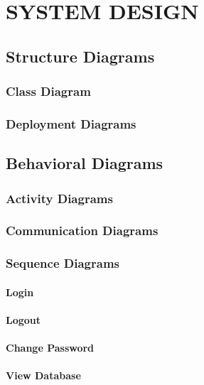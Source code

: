 \chapter{SYSTEM DESIGN}
\section{Structure Diagrams}
\subsection{Class Diagram}
\subsection{Deployment Diagrams}
\section{Behavioral Diagrams}
\subsection{Activity Diagrams}
\subsection{Communication Diagrams}
\subsection{Sequence Diagrams}
\subsubsection{Login}
\subsubsection{Logout}
\subsubsection{Change Password}
\subsubsection{View Database}